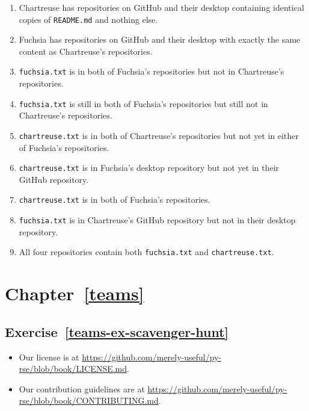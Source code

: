 \documentclass[
]{krantz}
\providecommand{\tightlist}{%
  \setlength{\itemsep}{0pt}\setlength{\parskip}{0pt}}
\begin{document}
\begin{enumerate}
\def\labelenumi{\arabic{enumi}.}
\tightlist
\item
  Chartreuse has repositories on GitHub and their desktop
  containing identical copies of \texttt{README.md} and nothing else.
\item
  Fuchsia has repositories on GitHub and their desktop
  with exactly the same content as Chartreuse's repositories.
\item
  \texttt{fuchsia.txt} is in both of Fuchsia's repositories
  but not in Chartreuse's repositories.
\item
  \texttt{fuchsia.txt} is still in both of Fuchsia's repositories
  but still not in Chartreuse's repositories.
\item
  \texttt{chartreuse.txt} is in both of Chartreuse's repositories
  but not yet in either of Fuchsia's repositories.
\item
  \texttt{chartreuse.txt} is in Fuchsia's desktop repository
  but not yet in their GitHub repository.
\item
  \texttt{chartreuse.txt} is in both of Fuchsia's repositories.
\item
  \texttt{fuchsia.txt} is in Chartreuse's GitHub repository
  but not in their desktop repository.
\item
  All four repositories contain both \texttt{fuchsia.txt} and \texttt{chartreuse.txt}.
\end{enumerate}

\hypertarget{chapter-refteams}{%
\section*{Chapter~\ref{teams}}\label{chapter-refteams}}

\hypertarget{exercise-refteams-ex-scavenger-hunt}{%
\subsection*{Exercise~\ref{teams-ex-scavenger-hunt}}\label{exercise-refteams-ex-scavenger-hunt}}


\begin{itemize}
\item
  Our license is at \url{https://github.com/merely-useful/py-rse/blob/book/LICENSE.md}.
\item
  Our contribution guidelines are at \url{https://github.com/merely-useful/py-rse/blob/book/CONTRIBUTING.md}.
\end{itemize}
\end{document}
